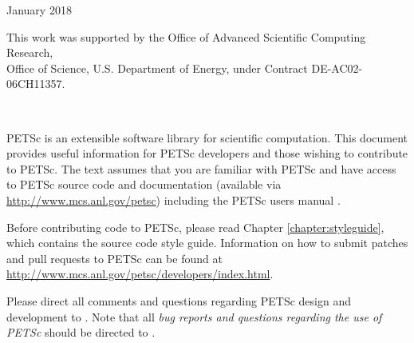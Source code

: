 \vspace*{30pt}
\noindent January 2018

\vspace*{20pt}
\noindent This work was supported by the Office of Advanced Scientific Computing Research, \\
Office of Science, U.S. Department of Energy, under Contract DE-AC02-06CH11357.


\newpage

\hbox{ }

\vspace{1in}
\date{\today}

\pagestyle{empty}
\newpage

\medskip \medskip

%
%

\medskip \medskip
PETSc is an extensible software library for scientific
computation. This document provides useful information for PETSc
developers and those wishing to contribute to PETSc. The text assumes
that you are familiar with PETSc and have access to PETSc source code
and documentation (available
via \href{http://www.mcs.anl.gov/petsc}{http://www.mcs.anl.gov/petsc}) including the PETSc users manual \cite{petsc-user-ref}.

Before contributing code to PETSc, please read Chapter \ref{chapter:styleguide}, which contains the source code style guide.
Information on how to submit patches and pull requests to PETSc can be found at
\href{http://www.mcs.anl.gov/petsc/developers/index.html}{http://www.mcs.anl.gov/petsc/developers/index.html}.

\vspace{1cm}

Please direct all comments and questions regarding PETSc design and
development to .  Note that all {\em
bug reports and questions regarding the use of PETSc} should
be directed to .

%
%

\newpage
\hbox{ }
\newpage


